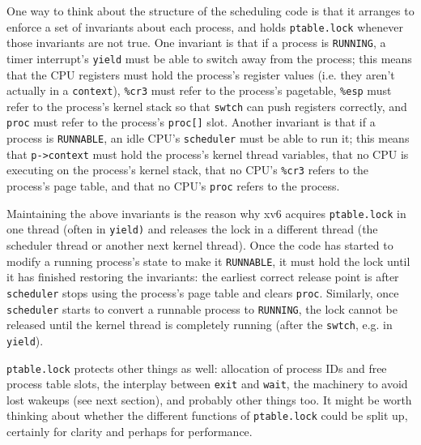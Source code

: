 One way to think about the structure of the scheduling code is
that it arranges to enforce a set of invariants about each process,
and holds
\lstinline{ptable.lock}
whenever those invariants are not true.
One invariant is that if a process is
\lstinline{RUNNING},
a timer interrupt's
\lstinline{yield}
must be able to switch away from the process;
this means that the CPU registers must hold the process's register values
(i.e. they aren't actually in a
\lstinline{context}),
\texttt{\%cr3}
must refer to the process's pagetable,
\texttt{\%esp}
must refer to the process's kernel stack so that
\lstinline{swtch}
can push registers correctly, and
\lstinline{proc}
must refer to the process's
\lstinline{proc[]}
slot.
Another invariant is that if a process is
\lstinline{RUNNABLE},
an idle CPU's
\lstinline{scheduler}
must be able to run it;
this means that 
\lstinline{p->context}
must hold the process's kernel thread variables,
that no CPU is executing on the process's kernel stack,
that no CPU's
\texttt{\%cr3}
refers to the process's page table,
and that no CPU's
\lstinline{proc}
refers to the process.

Maintaining the above invariants is the reason why xv6 acquires 
\lstinline{ptable.lock}
in one thread (often in
\lstinline{yield)}
and releases the lock in a different thread
(the scheduler thread or another next kernel thread).
Once the code has started to modify a running process's state
to make it
\lstinline{RUNNABLE},
it must hold the lock until it has finished restoring
the invariants: the earliest correct release point is after
\lstinline{scheduler}
stops using the process's page table and clears
\lstinline{proc}.
Similarly, once 
\lstinline{scheduler}
starts to convert a runnable process to
\lstinline{RUNNING},
the lock cannot be released until the kernel thread
is completely running (after the
\lstinline{swtch},
e.g. in
\lstinline{yield}).

\lstinline{ptable.lock}
protects other things as well:
allocation of process IDs and free process table slots,
the interplay between
\lstinline{exit}
and
\lstinline{wait},
the machinery to avoid lost wakeups (see next section),
and probably other things too.
It might be worth thinking about whether the 
different functions of
\lstinline{ptable.lock}
could be split up, certainly for clarity and perhaps
for performance.
